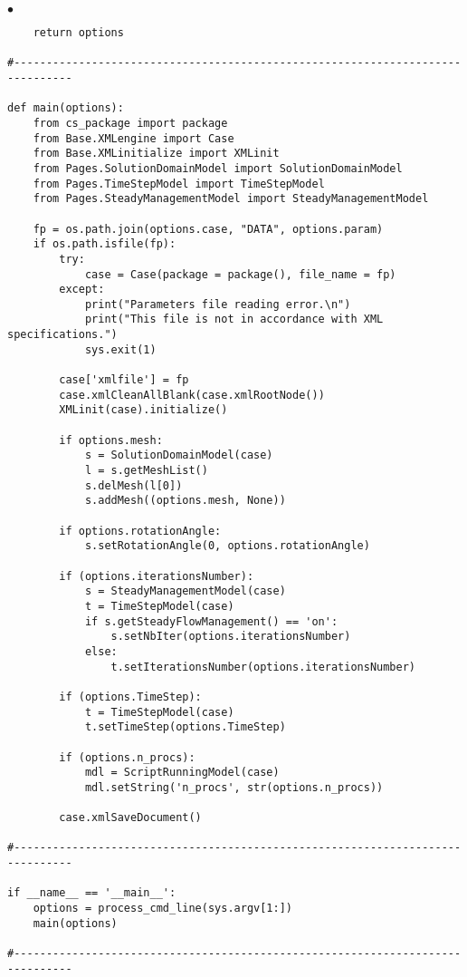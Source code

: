 \documentclass[a4paper,10pt,twoside]{csshortdoc}
\begin{document}
\begin{list}{$\bullet$}{}
\begin{verbatim}
    return options

#-------------------------------------------------------------------------------

def main(options):
    from cs_package import package
    from Base.XMLengine import Case
    from Base.XMLinitialize import XMLinit
    from Pages.SolutionDomainModel import SolutionDomainModel
    from Pages.TimeStepModel import TimeStepModel
    from Pages.SteadyManagementModel import SteadyManagementModel

    fp = os.path.join(options.case, "DATA", options.param)
    if os.path.isfile(fp):
        try:
            case = Case(package = package(), file_name = fp)
        except:
            print("Parameters file reading error.\n")
            print("This file is not in accordance with XML specifications.")
            sys.exit(1)

        case['xmlfile'] = fp
        case.xmlCleanAllBlank(case.xmlRootNode())
        XMLinit(case).initialize()

        if options.mesh:
            s = SolutionDomainModel(case)
            l = s.getMeshList()
            s.delMesh(l[0])
            s.addMesh((options.mesh, None))

        if options.rotationAngle:
            s.setRotationAngle(0, options.rotationAngle)

        if (options.iterationsNumber):
            s = SteadyManagementModel(case)
            t = TimeStepModel(case)
            if s.getSteadyFlowManagement() == 'on':
                s.setNbIter(options.iterationsNumber)
            else:
                t.setIterationsNumber(options.iterationsNumber)

        if (options.TimeStep):
            t = TimeStepModel(case)
            t.setTimeStep(options.TimeStep)

        if (options.n_procs):
            mdl = ScriptRunningModel(case)
            mdl.setString('n_procs', str(options.n_procs))

        case.xmlSaveDocument()

#-------------------------------------------------------------------------------

if __name__ == '__main__':
    options = process_cmd_line(sys.argv[1:])
    main(options)

#-------------------------------------------------------------------------------
\end{verbatim}
\normalsize

\end{list}


%
\end{document}
